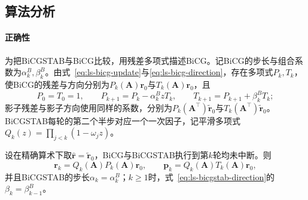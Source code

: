\subsection{算法分析}

\paragraph{正确性}
为把BiCGSTAB与BiCG比较，用残差多项式描述BiCG。记BiCG的步长与组合系数为$\alpha_k^{B},\beta_k^{B}$。由式~\eqref{eq:ls-bicg-update}与\eqref{eq:ls-bicg-direction}，存在多项式$P_k,T_k$，使BiCG的残差与方向分别为$P_k(\bm A)\bm r_0$与$T_k(\bm A)\bm r_0$，且
\[
 P_0=T_0=1,\qquad P_{k+1}=P_k-\alpha_k^{B}zT_k,\qquad T_{k+1}=P_{k+1}+\beta_k^{B}T_k ;
\]
影子残差与影子方向使用同样的系数，分别为$P_k(\bm A^\top)\widetilde{\bm r}_0$与$T_k(\bm A^\top)\widetilde{\bm r}_0$。BiCGSTAB每轮的第二个半步对应一个一次因子，记平滑多项式$Q_k(z)=\prod_{j<k}(1-\omega_jz)$。

\begin{theorem}[BiCGSTAB与BiCG的关系]
\label{thm:ls-bicgstab-bicg-relation}
设在精确算术下取$\widehat{\bm r}=\widetilde{\bm r}_0$，BiCG与BiCGSTAB执行到第$k$轮均未中断。则
\begin{equation}
 \bm r_k=Q_k(\bm A)P_k(\bm A)\bm r_0,\qquad \bm p_k=Q_k(\bm A)T_k(\bm A)\bm r_0,
 \label{eq:ls-bicgstab-bicg-relation}
\end{equation}
并且BiCGSTAB的步长$\alpha_k=\alpha_k^{B}$；$k\ge1$时，式~\eqref{eq:ls-bicgstab-direction}的$\beta_k=\beta_{k-1}^{B}$。
\end{theorem}

